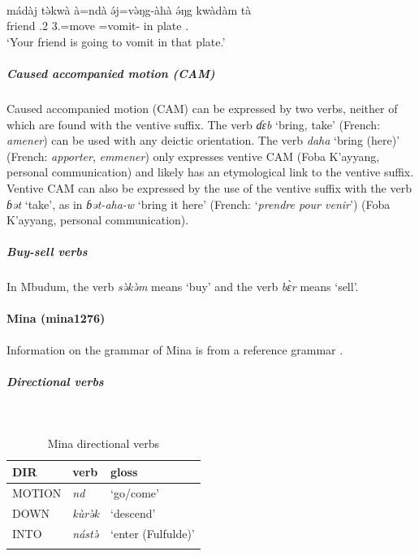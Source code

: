 \ex\label{ex2:mbud6}
 \\
\gll mádàj	tə̀kwà	à=ndà	ə́j=və̀ŋg-àhà	ə́ŋg	kwàdàm	tà \\
friend	.2	3.=move	=vomit-	in	plate	. \\
\glt `Your friend is going to vomit in that plate.' 
\z 

\subparagraph{Caused accompanied motion (CAM)}

Caused accompanied motion (CAM) can be expressed by two verbs, neither of which are found with the ventive suffix. The verb \textit{ɗɛb} `bring, take' (French: \textit{amener}) can be used with any deictic orientation. The verb \textit{daha} `bring (here)' (French: \textit{apporter}, \textit{emmener}) only expresses ventive CAM (Foba K'ayyang, personal communication) and likely has an etymological link to the ventive suffix. Ventive CAM can also be expressed by the use of the ventive suffix with the verb \textit{ɓət} `take', as in \textit{ɓət-aha-w} `bring it here' (French: `\textit{prendre pour venir}') (Foba K'ayyang, personal communication). 

\subparagraph{Buy-sell verbs}

In Mbudum, the verb \textit{sə̀kə̀m}  means `buy' and the verb \textit{bɛ̀r} means `sell'. 

\paragraph*{Mina (mina1276)} \label{mina}

Information on the grammar of Mina is from a reference grammar \citep{frajzyngierGrammarMina2005}.

\subparagraph{Directional verbs}~

\begin{table}[H]
\caption{Mina directional verbs} 
\label{tab:minaV}
\begin{tabular}{lll} %
	\lsptoprule
	DIR & verb & gloss   \\ %
	\midrule
	MOTION & \textit{nd} & `go/come' \\
	DOWN & \textit{kùrə̀k} & `descend' \\
	INTO& \textit{nástə̀} & `enter (Fulfulde)' \\
	\lspbottomrule
\end{tabular}
\end{table}


